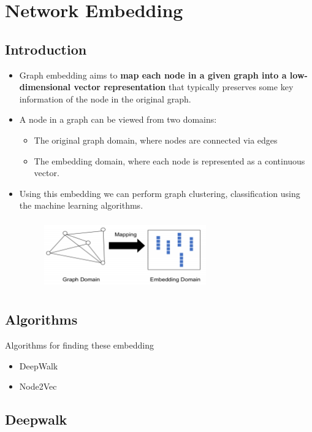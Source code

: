 \chapter{Network Embedding}


\section{Introduction}
\begin{itemize}
    \item Graph embedding aims to \textbf{map each node in a given graph into a low-dimensional vector representation} that typically preserves some key information of the node in the original graph.
    \item A node in a graph can be viewed from two domains:
    \begin{itemize}
        \item The original graph domain, where nodes are connected via edges
        \item The embedding domain, where each node is represented as a continuous vector.
    \end{itemize}
    \item Using this embedding we can perform graph clustering, classification using the machine learning algorithms.
    \begin{figure}[h] 
        \centering
        \includegraphics[height=3cm, width=7cm]{tex/img/Embedding.png} 
    \end{figure}
\end{itemize}
\section{Algorithms}
    \item Algorithms for finding these embedding
    \begin{itemize}
        \item DeepWalk
        \item Node2Vec
    \end{itemize}
\newpage
\section{Deepwalk}
